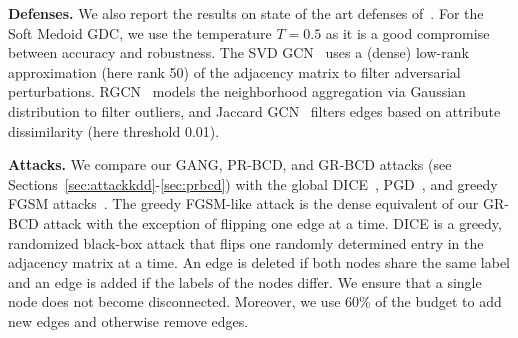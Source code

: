 \documentclass[letterpaper]{article} %
\newcommand{\todo}[1]{\textcolor{red}{(Todo: #1)}}
\begin{document}
\textbf{Defenses.} We also report the results on state of the art defenses of~\citep{Entezari2020, Geisler2020, Wu2019, Zhu2019}. For the Soft Medoid GDC, we use the temperature \(T=0.5\) as it is a good compromise between accuracy and robustness. The SVD GCN~\citep{Entezari2020} uses a (dense) low-rank approximation (here rank 50) of the adjacency matrix to filter adversarial perturbations. RGCN~\citep{Zhu2019} models the neighborhood aggregation via Gaussian distribution to filter outliers, and Jaccard GCN~\citep{Wu2019} filters edges based on attribute dissimilarity (here threshold 0.01). 


\textbf{Attacks.} We compare our GANG, PR-BCD, and GR-BCD attacks (see Sections~\ref{sec:attackkdd}-\ref{sec:prbcd}) with the global DICE~\citep{Waniek2018}, PGD~\citep{Xu2019a}, and greedy FGSM attacks~\citet{Geisler2020}. The greedy FGSM-like attack is the dense equivalent of our GR-BCD attack with the exception of flipping one edge at a time. DICE is a greedy, randomized black-box attack that flips one randomly determined entry in the adjacency matrix at a time. An edge is deleted if both nodes share the same label and an edge is added if the labels of the nodes differ. We ensure that a single node does not become disconnected. Moreover, we use 60\% of the budget to add new edges and otherwise remove edges.

\begin{table}[t]
\centering
\caption{Statistics of the used datasets. For the dense adjacency matrix we assume that each element is represented by 4 bytes. In the sparse case we use two 8 byte integer pointers and a 4 bytes float value.}
\label{tab:datasets}
\end{table}
\end{document}
